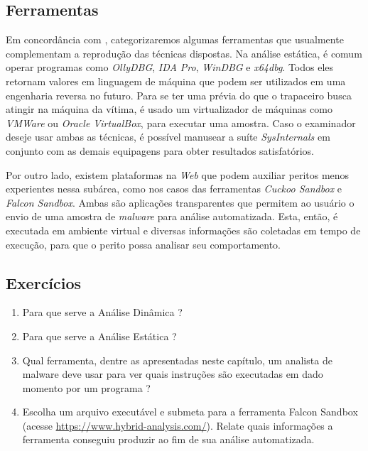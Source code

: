     \subsection{Ferramentas}
    
    \hspace{1cm}
    Em concordância com , categorizaremos algumas ferramentas que usualmente complementam a reprodução das técnicas dispostas. Na análise estática, é comum operar programas como \textit{OllyDBG}, \textit{IDA Pro}, \textit{WinDBG} e \textit{x64dbg}. Todos eles retornam valores em linguagem de máquina que podem ser utilizados em uma engenharia reversa no futuro. Para se ter uma prévia do que o trapaceiro busca atingir na máquina da vítima, é usado um virtualizador de máquinas como \textit{VMWare} ou \textit{Oracle VirtualBox}, para executar uma amostra. Caso o examinador deseje usar ambas as técnicas, é possível manusear a suíte \textit{SysInternals} em conjunto com as demais equipagens para obter resultados satisfatórios.
    
    \vspace{4mm}

    \hspace{1cm}
    Por outro lado, existem plataformas na \textit{Web} que podem auxiliar peritos menos experientes nessa subárea, como nos casos das ferramentas \textit{Cuckoo Sandbox} e \textit{Falcon Sandbox}. Ambas são aplicações transparentes que permitem ao usuário o envio de uma amostra de \textit{malware} para análise automatizada. Esta, então, é executada em ambiente virtual e diversas informações são coletadas em tempo de execução, para que o perito possa analisar seu comportamento.

    \subsection{Exercícios}
    
    \begin{example} \label{cap7_exercicios}
        \begin{enumerate}
           \item Para que serve a Análise Dinâmica ?
           \item Para que serve a Análise Estática ?
           \item Qual ferramenta, dentre as apresentadas neste capítulo, um analista de malware deve usar para ver quais instruções são executadas em dado momento por um programa ?
           \item Escolha um arquivo executável e submeta para a ferramenta Falcon Sandbox (acesse \url{https://www.hybrid-analysis.com/}). Relate quais informações a ferramenta conseguiu produzir ao fim de sua análise automatizada.
        \end{enumerate}
    \end{example}

\newpage